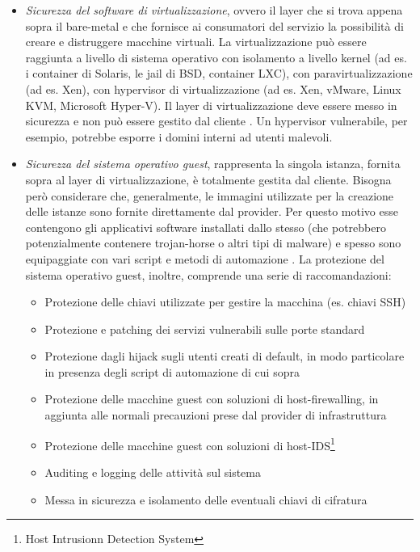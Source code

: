 \documentclass[../main.tex]{subfiles}
\begin{document}
\begin{itemize}
\item \textit{Sicurezza del software di virtualizzazione}, ovvero il layer che si trova appena sopra il bare-metal e che fornisce ai consumatori del servizio la possibilità di creare e distruggere macchine virtuali. La virtualizzazione può essere raggiunta a livello di sistema operativo con isolamento a livello kernel (ad es. i container di Solaris, le jail di BSD, container LXC), con paravirtualizzazione (ad es. Xen), con hypervisor di virtualizzazione (ad es. Xen, vMware, Linux KVM, Microsoft Hyper-V). Il layer di virtualizzazione deve essere messo in sicurezza e non può essere gestito dal cliente \cite{CloudSecurityBook}.
Un hypervisor vulnerabile, per esempio, potrebbe esporre i domini interni ad utenti malevoli. 
\item \textit{Sicurezza del sistema operativo guest}, rappresenta la singola istanza, fornita sopra al layer di virtualizzazione, è totalmente gestita dal cliente.
Bisogna però considerare che, generalmente, le immagini utilizzate per la creazione delle istanze sono fornite direttamente dal provider. Per questo motivo esse contengono gli applicativi software installati dallo stesso (che potrebbero potenzialmente contenere trojan-horse o altri tipi di malware) e spesso sono equipaggiate con vari script e metodi di automazione \cite{CloudSecurityBook}.
La protezione del sistema operativo guest, inoltre, comprende una serie di raccomandazioni:
\begin{itemize}
\item Protezione delle chiavi utilizzate per gestire la macchina (es. chiavi SSH)
\item Protezione e patching dei servizi vulnerabili sulle porte standard
\item Protezione dagli hijack sugli utenti creati di default, in modo particolare in presenza degli script di automazione di cui sopra
\item Protezione delle macchine guest con soluzioni di host-firewalling, in aggiunta alle normali precauzioni prese dal provider di infrastruttura
\item Protezione delle macchine guest con soluzioni di host-IDS\footnote{Host Intrusionn Detection System}
\item Auditing e logging delle attività sul sistema
\item Messa in sicurezza e isolamento delle eventuali chiavi di cifratura
\end{itemize}
\end{itemize}
\end{document}

